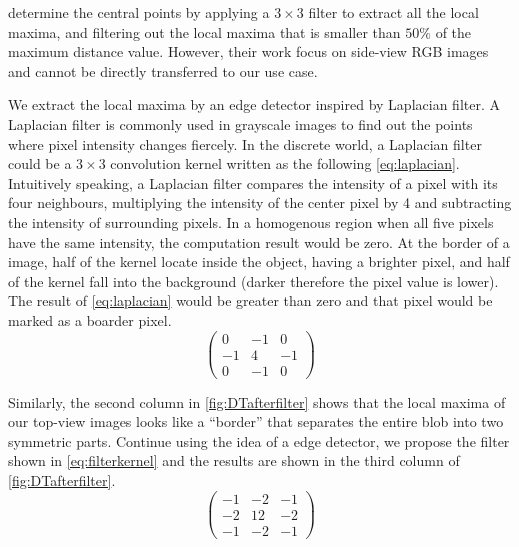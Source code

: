 \citeauthor{sharma2012blob} \cite{sharma2012blob} determine the central points by applying a $3\times3$ filter to extract all the local maxima, and filtering out the local maxima that is smaller than $50\%$ of the maximum distance value. However, their work focus on side-view RGB images and cannot be directly transferred to our use case.

We extract the local maxima by an edge detector inspired by Laplacian filter. A Laplacian filter is commonly used in grayscale images to find out the points where pixel intensity changes fiercely. In the discrete world, a Laplacian filter could be a $3\times3$ convolution kernel written as the following \autoref{eq:laplacian}. Intuitively speaking, a Laplacian filter compares the intensity of a pixel with its four neighbours, multiplying the intensity of the center pixel by 4 and subtracting the intensity of surrounding pixels. In a homogenous region when all five pixels have the same intensity, the computation result would be zero. At the border of a image, half of the kernel locate inside the object, having a brighter pixel, and half of the kernel fall into the background (darker therefore the pixel value is lower). The result of \autoref{eq:laplacian} would be greater than zero and that pixel would be marked as a boarder pixel.
\begin{equation}\label{eq:laplacian}
  \begin{pmatrix}
    0 & -1 & 0 \\
    -1 & 4 & -1 \\
    0 & -1 & 0
  \end{pmatrix}
\end{equation}

Similarly, the second column in \autoref{fig:DTafterfilter} shows that the local maxima of our top-view images looks like a ``border'' that separates the entire blob into two symmetric parts. Continue using the idea of a edge detector, we propose the filter shown in \autoref{eq:filterkernel} and the results are shown in the third column of \autoref{fig:DTafterfilter}.
\begin{equation}\label{eq:filterkernel}
  \begin{pmatrix}
    -1 & -2 & -1 \\
    -2 & 12 & -2 \\
    -1 & -2 & -1
  \end{pmatrix}
\end{equation}

